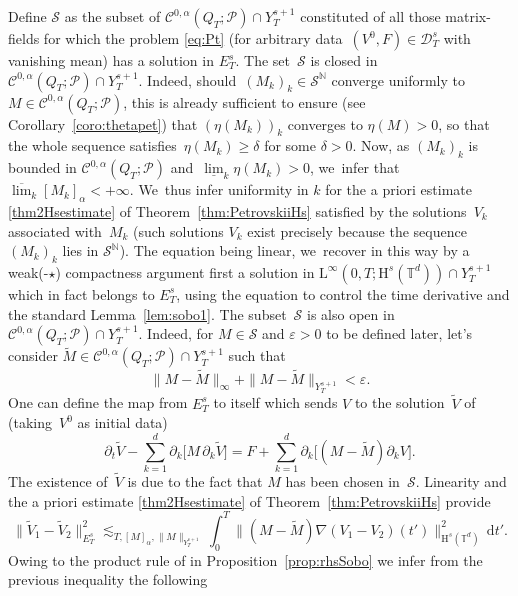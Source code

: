 \documentclass[10pt]{amsart}
\theoremstyle{definition}
\newcommand\N{\mathbb{N}}
\newcommand\T{\mathbb{T}}
\newcommand\dd{\mathrm{d}}
\renewcommand\H{\mathrm{H}}
\renewcommand\L{\mathrm{L}}
\let\ep\varepsilon
\begin{document}
Define $\mathscr{S}$ as the subset of $\mathscr{C}^{0,\alpha}(Q_T;\mathscr{P})\cap Y_T^{s+1}$ constituted of all those matrix-fields for which the problem \eqref{eq:Pt} (for arbitrary data~$(V^0,F)\in\mathcal{D}^s_T$ with vanishing mean) has a solution in $E_T^s$. The set~$\mathscr{S}$ is closed in~$\mathscr{C}^{0,\alpha}(Q_T;\mathscr{P})\cap Y_T^{s+1}$. Indeed, should~$(M_k)_k\in\mathscr{S}^\N$ converge uniformly to $M\in\mathscr{C}^{0,\alpha}(Q_T;\mathscr{P})$, this is already sufficient to ensure (see Corollary~\ref{coro:thetapet}) that $(\eta(M_k))_k$ converges to $\eta(M)>0$, so that the whole sequence satisfies~$\eta(M_k)\geq \delta$ for some $\delta>0$. Now, as $(M_k)_k$ is bounded in $\mathscr{C}^{0,\alpha}(Q_T;\mathscr{P})$ and~$\underline{\lim}_k \eta(M_k)>0$, we~infer that~$\overline{\lim}_k [M_k]_\alpha<+\infty$. We~thus infer uniformity in $k$ for the a priori estimate \eqref{thm2Hsestimate} of Theorem~\ref{thm:PetrovskiiHs} satisfied by the solutions~$V_k$ associated with~$M_k$ (such solutions $V_k$ exist precisely because the sequence $(M_k)_k$ lies in $\mathscr{S}^\N$). The equation being linear, we~recover in this way by a weak(-$\star$) compactness argument first a solution in $\L^\infty(0,T;\H^s(\T^d))\cap Y_T^{s+1}$ which in fact belongs to $E_T^s$, using the equation to control the time derivative and the standard Lemma~\ref{lem:sobo1}. The subset~$\mathscr{S}$ is also open in~$\mathscr{C}^{0,\alpha}(Q_T;\mathscr{P})\cap Y_T^{s+1}$. Indeed, for $M\in\mathscr{S}$ and $\ep>0$ to be defined later, let's consider $\widetilde{M}\in\mathscr{C}^{0,\alpha}(Q_T;\mathscr{P})\cap Y_T^{s+1}$ such that
\[
\|M-\widetilde{M}\|_\infty +\|M-\widetilde{M}\|_{Y_T^{s+1}}< \ep.
\]
One can define the map from $E_T^s$ to itself which sends $V$ to the solution~$\widetilde{V}$ of (taking~$V^0$ as initial data)\vspace*{-3pt}
\[
\partial_t \widetilde{V}-\sum_{k=1}^d \partial_k \bigl[M\,\partial_k \widetilde{V}\bigr] = F+\sum_{k=1}^d \partial_k\bigl[(M-\widetilde{M})\partial_k V\bigr].
\]
The existence of~$\widetilde{V}$ is due to the fact that $M$ has been chosen in~$\mathscr{S}$. Linearity and the a priori estimate \eqref{thm2Hsestimate} of Theorem~\ref{thm:PetrovskiiHs} provide\vspace*{-3pt}
\[
\|\widetilde{V}_1-\widetilde{V}_{2}\|_{E_T^s}^2 \lesssim_{T,[M]_\alpha,\|M\|_{Y_T^{s+1}}} \int_0^T \|(M-\widetilde{M})\nabla (V_1-V_2)(t')\|_{\H^s(\T^d)}^2\,\dd t'.
\]
Owing to the product rule of in Proposition~\ref{prop:rhsSobo} we infer from the previous inequality the following\vspace*{-3pt}
\end{document}
